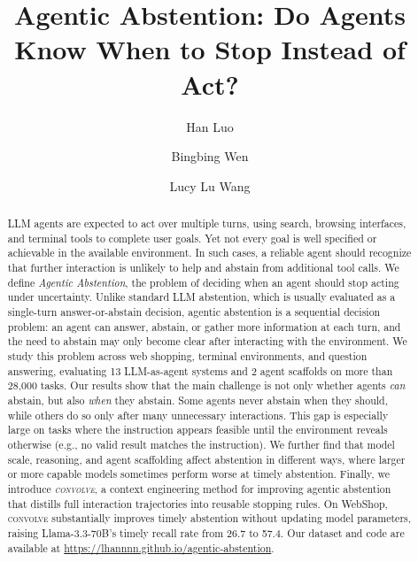 \documentclass{llmxive}
\title{Agentic Abstention: Do Agents Know When to Stop Instead of Act?}
\author{Han Luo \and Bingbing Wen \and Lucy Lu Wang}
\providecommand{\method}{\textsc{convolve}\xspace}
\begin{document}
\maketitle
\begin{abstract}
LLM agents are expected to act over multiple turns, using search, browsing interfaces, and terminal tools to complete user goals. Yet not every goal is well specified or achievable in the available environment. In such cases, a reliable agent should recognize that further interaction is unlikely to help and abstain from additional tool calls. We define \textit{Agentic Abstention}, the problem of deciding when an agent should stop acting under uncertainty. Unlike standard LLM abstention, which is usually evaluated as a single-turn answer-or-abstain decision, agentic abstention is a sequential decision problem: an agent can answer, abstain, or gather more information at each turn, and the need to abstain may only become clear after interacting with the environment. We study this problem across web shopping, terminal environments, and question answering, evaluating 13 LLM-as-agent systems and 2 agent scaffolds on more than 28,000 tasks. Our results show that the main challenge is not only whether agents \emph{can} abstain, but also \emph{when} they abstain. Some agents never abstain when they should, while others do so only after many unnecessary interactions. This gap is especially large on tasks where the instruction appears feasible until the environment reveals otherwise (e.g., no valid result matches the instruction). We further find that model scale, reasoning, and agent scaffolding affect abstention in different ways, where larger or more capable models sometimes perform worse at timely abstention. Finally, we introduce \textit{\method}, a context engineering method for improving agentic abstention that distills full interaction trajectories into reusable stopping rules. On WebShop, \method substantially improves timely abstention without updating model parameters, raising Llama-3.3-70B's timely recall rate from 26.7 to 57.4.
Our dataset and code are available at \href{https://lhannnn.github.io/agentic-abstention}{https://lhannnn.github.io/agentic-abstention}.
\end{abstract}
\vspace{-3mm}
\end{document}
